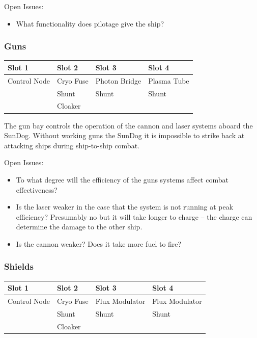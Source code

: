 Open Issues:
\begin{itemize}
\item What functionality does pilotage give the ship?
\end{itemize}

\subsubsection{Guns}

\begin{tabular}{ | p{2.5cm} | p{2.5cm} | p{2.5cm} | p{2.5cm} | }
\hline
Slot 1 & Slot 2 & Slot 3 & Slot 4 \\ \hline
Control Node & Cryo Fuse & Photon Bridge & Plasma Tube \\
& Shunt & Shunt & Shunt \\
& Cloaker & & \\
\hline
\end{tabular}

The gun bay controls the operation of the cannon and laser systems aboard
the SunDog.  Without working guns the SunDog it is impossible to strike
back at attacking ships during ship-to-ship combat.

Open Issues:
\begin{itemize}
\item To what degree will the efficiency of the guns systems affect
combat effectiveness?
\item Is the laser weaker in the case that the system is not running
at peak efficiency?  Presumably no but it will take longer to charge --
the charge can determine the damage to the other ship.
\item Is the cannon weaker?  Does it take more fuel to fire?
\end{itemize}

\subsubsection{Shields}

\begin{tabular}{ | p{2.5cm} | p{2.5cm} | p{2.5cm} | p{2.5cm} | }
\hline
Slot 1 & Slot 2 & Slot 3 & Slot 4 \\ \hline
Control Node & Cryo Fuse & Flux Modulator & Flux Modulator \\
& Shunt & Shunt & Shunt \\
& Cloaker & & \\
\hline
\end{tabular}

